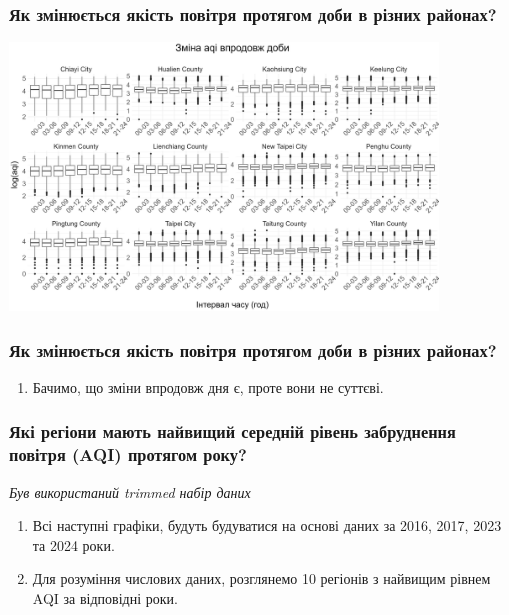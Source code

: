 \documentclass{beamer}
\begin{document}
\begin{frame}
  \frametitle{Як змінюється якість повітря протягом доби в різних районах?}

  \begin{center}
    \includegraphics[height=2.8in]{plots/question3/county-box-p2.png}
  \end{center}
\end{frame}

\begin{frame}
  \frametitle{Як змінюється якість повітря протягом доби в різних районах?}

  \begin{enumerate}
    \item Бачимо, що зміни впродовж дня є, проте вони не суттєві.
  \end{enumerate}
\end{frame}


\begin{frame}
  \frametitle{Які регіони мають найвищий середній рівень забруднення повітря (AQI) протягом року?}

  \textit{Був використаний trimmed набір даних}

  \begin{enumerate}
    \item Всі наступні графіки, будуть будуватися на основі даних за
    2016, 2017, 2023 та 2024 роки.
    \item  Для розуміння числових даних, розглянемо 10 регіонів з
    найвищим рівнем AQI за відповідні роки.
  \end{enumerate}
\end{frame}
\end{document}
